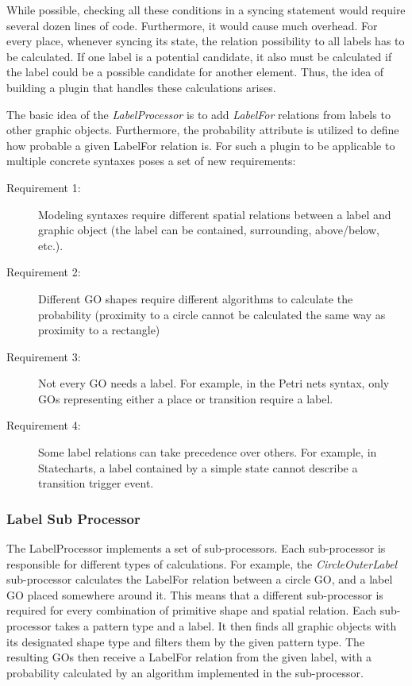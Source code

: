While possible, checking all these conditions in a syncing statement would require several dozen lines of code. Furthermore, it would cause much overhead. For every place, whenever syncing its state, the relation possibility to all labels has to be calculated. If one label is a potential candidate, it also must be calculated if the label could be a possible candidate for another element. Thus, the idea of building a plugin that handles these calculations arises.

The basic idea of the \emph{LabelProcessor} is to add \emph{LabelFor} relations from labels to other graphic objects. Furthermore, the probability attribute is utilized to define how probable a given LabelFor relation is. For such a plugin to be applicable to multiple concrete syntaxes poses a set of new requirements:
\begin{description}
  \item[Requirement 1:] Modeling syntaxes require different spatial relations between a label and graphic object (the label can be contained, surrounding, above/below, etc.).
  \item[Requirement 2:] Different GO shapes require different algorithms to calculate the probability (proximity to a circle cannot be calculated the same way as proximity to a rectangle)
  \item[Requirement 3:] Not every GO needs a label. For example, in the Petri nets syntax, only GOs representing either a place or transition require a label.
  \item[Requirement 4:]  Some label relations can take precedence over others. For example, in Statecharts, a label contained by a simple state cannot describe a transition trigger event. 
\end{description}


\subsubsection{Label Sub Processor}
The LabelProcessor implements a set of sub-processors. Each sub-processor is responsible for different types of calculations. For example, the \emph{CircleOuterLabel} sub-processor calculates the LabelFor relation between a circle GO, and a label GO placed somewhere around it. This means that a different sub-processor is required for every combination of primitive shape and spatial relation. Each sub-processor takes a pattern type and a label. It then finds all graphic objects with its designated shape type and filters them by the given pattern type. The resulting GOs then receive a LabelFor relation from the given label, with a probability calculated by an algorithm implemented in the sub-processor.

